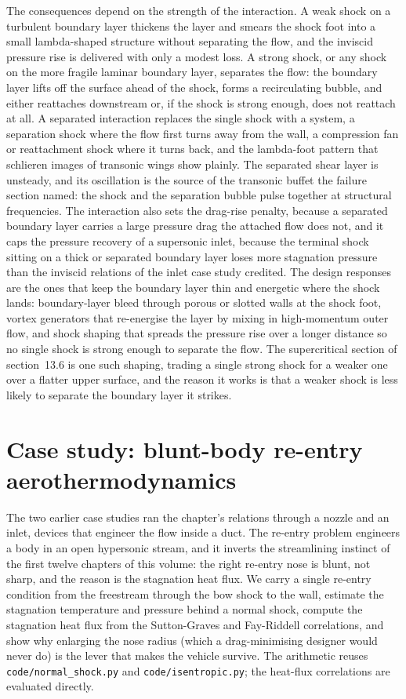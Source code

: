 The consequences depend on the strength of the interaction. A weak shock
on a turbulent boundary layer thickens the layer and smears the shock
foot into a small lambda-shaped structure without separating the flow,
and the inviscid pressure rise is delivered with only a modest loss. A
strong shock, or any shock on the more fragile laminar boundary layer,
separates the flow: the boundary layer lifts off the surface ahead of
the shock, forms a recirculating bubble, and either reattaches
downstream or, if the shock is strong enough, does not reattach at all.
A separated interaction replaces the single shock with a system, a
separation shock where the flow first turns away from the wall, a
compression fan or reattachment shock where it turns back, and the
lambda-foot pattern that schlieren images of transonic wings show
plainly. The separated shear layer is unsteady, and its oscillation is
the source of the transonic buffet the failure section named: the shock
and the separation bubble pulse together at structural frequencies. The
interaction also sets the drag-rise penalty, because a separated
boundary layer carries a large pressure drag the attached flow does not,
and it caps the pressure recovery of a supersonic inlet, because the
terminal shock sitting on a thick or separated boundary layer loses more
stagnation pressure than the inviscid relations of the inlet case study
credited. The design responses are the ones that keep the boundary layer
thin and energetic where the shock lands: boundary-layer bleed through
porous or slotted walls at the shock foot, vortex generators that
re-energise the layer by mixing in high-momentum outer flow, and shock
shaping that spreads the pressure rise over a longer distance so no
single shock is strong enough to separate the flow. The supercritical
section of section~13.6 is one such shaping, trading a single strong
shock for a weaker one over a flatter upper surface, and the reason it
works is that a weaker shock is less likely to separate the boundary
layer it strikes.

\section{Case study: blunt-body re-entry aerothermodynamics}

The two earlier case studies ran the chapter's relations through a
nozzle and an inlet, devices that engineer the flow inside a duct. The
re-entry problem engineers a body in an open hypersonic stream, and it
inverts the streamlining instinct of the first twelve chapters of this
volume: the right re-entry nose is blunt, not sharp, and the reason is
the stagnation heat flux. We carry a single re-entry condition from the
freestream through the bow shock to the wall, estimate the stagnation
temperature and pressure behind a normal shock, compute the stagnation
heat flux from the Sutton-Graves and Fay-Riddell correlations, and show
why enlarging the nose radius (which a drag-minimising designer would
never do) is the lever that makes the vehicle survive. The arithmetic
reuses \texttt{code/normal\_shock.py} and \texttt{code/isentropic.py};
the heat-flux correlations are evaluated directly.

